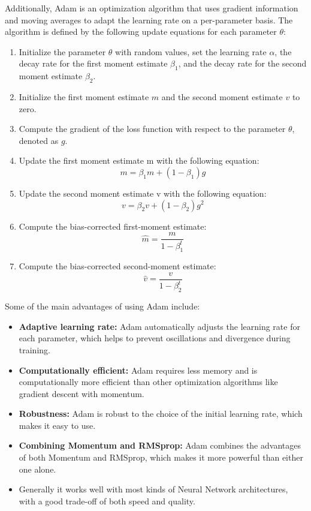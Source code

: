 \documentclass[a4paper]{article}
\begin{document}
Additionally, Adam is an optimization algorithm that uses gradient information and moving averages to adapt the learning rate on a per-parameter basis. The algorithm is defined by the following update equations for each parameter $\theta$:
\begin{enumerate}[leftmargin=7.5pt]
    \item Initialize the parameter $\theta$ with random values, set the learning rate $\alpha$, the decay rate for the first moment estimate $\beta_1$, and the decay rate for the second moment estimate $\beta_2$.
    \item Initialize the first moment estimate $m$ and the second moment estimate $v$ to zero.
    \item Compute the gradient of the loss function with respect to the parameter $\theta$, denoted as $g$.
    \item Update the first moment estimate m with the following equation:
$$    
m = \beta_1 m + (1-\beta_1) g
$$
    \item Update the second moment estimate v with the following equation:
$$
v = \beta_2 v + (1-\beta_2) g^2
$$
    \item Compute the bias-corrected first-moment estimate:
$$\hat{m} = \frac{m}{1-\beta_1^t}$$
    \item Compute the bias-corrected second-moment estimate:
$$\hat{v} = \frac{v}{1-\beta_2^t}$$
\end{enumerate}

Some of the main advantages of using Adam include:
\begin{itemize}[leftmargin=7.5pt]
    \item \textbf{Adaptive learning rate:} Adam automatically adjusts the learning rate for each parameter, which helps to prevent oscillations and divergence during training.
    \item \textbf{Computationally efficient:} Adam requires less memory and is computationally more efficient than other optimization algorithms like gradient descent with momentum.
    \item \textbf{Robustness:} Adam is robust to the choice of the initial learning rate, which makes it easy to use.
    \item \textbf{Combining Momentum and RMSprop:} Adam combines the advantages of both Momentum and RMSprop, which makes it more powerful than either one alone.
    \item Generally it works well with most kinds of Neural Network architectures, with a good trade-off of both speed and quality.
\end{itemize}
\end{document}
